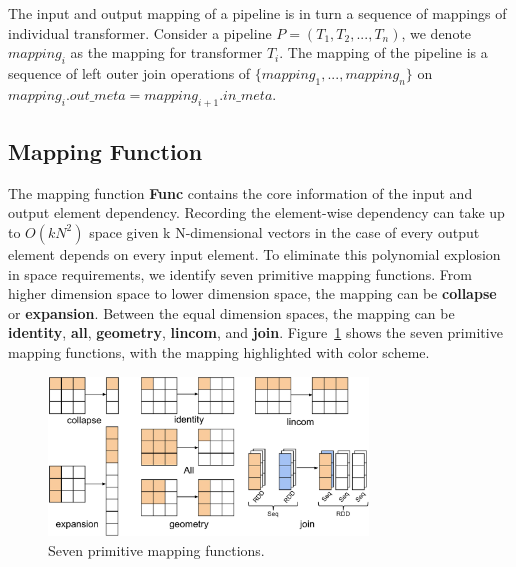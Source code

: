 \documentclass{sig-alternate}
\begin{document}
The input and output mapping of a pipeline is in turn a sequence of mappings of individual transformer.
Consider a pipeline $P=(T_1, T_2, ..., T_n)$, we denote $mapping_i$ as the mapping for transformer $T_i$.
The mapping of the pipeline is a sequence of left outer join operations of $\{mapping_1, ..., mapping_n\}$ on 
$mapping_i.out\_meta = mapping_{i+1}.in\_meta$.

\subsection{Mapping Function}
\label{sec:Map-Func}
The mapping function {\bf Func} contains the core information of the input and output element dependency.
Recording the element-wise dependency can take up to $O(kN^2)$ space given k N-dimensional vectors in the case
of every output element depends on every input element. 
To eliminate this polynomial explosion in space requirements, we identify seven primitive mapping functions.
From higher dimension space to lower dimension space, the mapping can be {\bf collapse} or {\bf expansion}.
Between the equal dimension spaces, the mapping can be {\bf identity}, {\bf all}, {\bf geometry}, {\bf lincom}, and {\bf join}.
Figure~\ref{fig:narrowmapping} shows the seven primitive mapping functions, with the mapping highlighted with color scheme.

\begin{figure}[t]
\begin{center}
    \includegraphics[width=85mm]{pictures/narrowmapping}
\caption {Seven primitive mapping functions.
    \label{fig:narrowmapping}
}
\end{center}
\end{figure}
\end{document}
